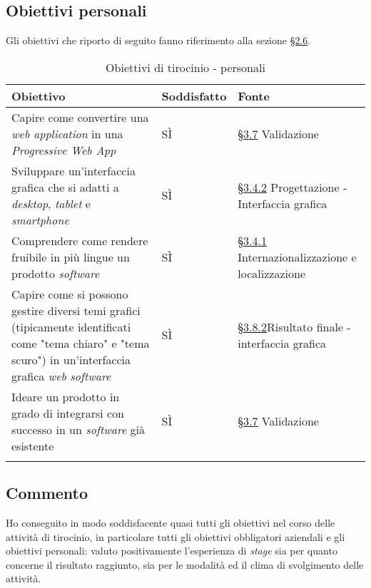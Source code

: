 \subsection{Obiettivi personali}
Gli obiettivi che riporto di seguito fanno riferimento alla sezione \hyperref[sec:obiettivi-personali]{§2.6}.

\begin{longtable}{>{\centering\arraybackslash}m{}>{\centering\arraybackslash}m{}>{\centering\arraybackslash}m{}}
    \hline
    \rowcolor{black}
    \color{white}\textbf{Obiettivo} & \color{white}\textbf{Soddisfatto} & \color{white}\textbf{Fonte} \\
    \hline
    \endhead %
    Capire come convertire una \textit{web application} in una \textit{Progressive Web App} & SÌ & \hyperref[sec:validazione]{§3.7} Validazione \\
    \hline
    Sviluppare un'interfaccia grafica che si adatti a \textit{desktop}, \textit{tablet} e \textit{smartphone} & SÌ & \hyperref[subsec:interfaccia]{§3.4.2} Progettazione - Interfaccia grafica \\
    \hline
    Comprendere come rendere fruibile in più lingue un prodotto \textit{software} & SÌ & \hyperref[subsec:internazionalizzazione]{§3.4.1} Internazionalizzazione e localizzazione \\
    \hline
    Capire come si possono gestire diversi temi grafici (tipicamente identificati come "tema chiaro" e "tema scuro") in un'interfaccia grafica \textit{web} \textit{software} & SÌ & \hyperref[subsec:interfaccia-risultato]{§3.8.2}Risultato finale - interfaccia grafica \\
    \hline
    Ideare un prodotto in grado di integrarsi con successo in un \textit{software} già esistente & SÌ & \hyperref[sec:validazione]{§3.7} Validazione \\
    \hline
    \caption{Obiettivi di tirocinio - personali}
\end{longtable}

\subsection{Commento}
Ho conseguito in modo soddisfacente quasi tutti gli obiettivi nel corso delle attività di tirocinio, in particolare tutti gli obiettivi obbligatori aziendali e gli obiettivi personali: valuto positivamente l'esperienza di \textit{stage} sia per quanto concerne il risultato raggiunto, 
sia per le modalità ed il clima di svolgimento delle attività.

